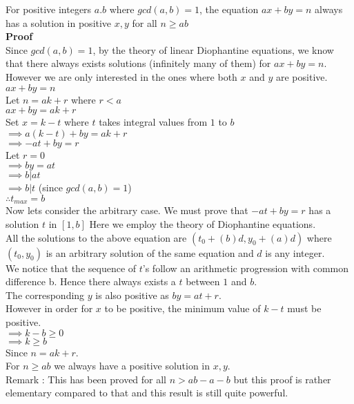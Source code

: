\documentclass{article}
\begin{document}
\setlength{\parindent}{0cm}  
For positive integers $a.b$ where $gcd(a,b) = 1$, the equation $ax + by = n$ always has a solution in positive $x,y$ for all $n \geq ab$ \\

\textbf{Proof} \\

Since $gcd(a,b) = 1$, by the theory of linear Diophantine equations, we know that there always exists solutions (infinitely many of them) for $ax + by = n$. However we are only interested in the ones where both $x$ and $y$ are positive.\\

$ax + by = n$ \\
Let $n = ak + r$ where $r<a$ \\
$ax + by = ak + r$ \\
Set $x = k - t$ where $t$ takes integral values from $1$ to $b$ \\
$\implies a(k - t) + by = ak + r$ \\
$\implies - at + by = r$ \\
Let $r = 0$ \\
$\implies by = at$ \\
$\implies b|at$ \\
$\implies b|t$ (since $gcd(a,b) = 1$) \\
$\therefore t_{max} = b$ \\

Now lets consider the arbitrary case. We must prove that $-at + by = r$ has a solution $t$ in $[1,b]$
Here we employ the theory of Diophantine equations. \\
All the solutions to the above equation are $(t_0 + (b)d, y_0 + (a)d)$ where $(t_0, y_0)$ is an arbitrary solution of the same equation and $d$ is any integer. \\
We notice that the sequence of $t$'s follow an arithmetic progression with common difference b. Hence there always exists a $t$ between $1$ and $b$.\\
The corresponding $y$ is also positive as $by = at + r$.\\ 

However in order for $x$ to be positive, the minimum value of $k-t$ must be positive. \\
$\implies k-b\geq 0$\\
$\implies k\geq b$\\

Since $n = ak + r$.\\
For $n \geq ab$ we always have a positive solution in $x,y$. \\

Remark : This has been proved for all $n > ab-a-b$ but this proof is rather elementary compared to that and this result is still quite powerful.    
\end{document}
